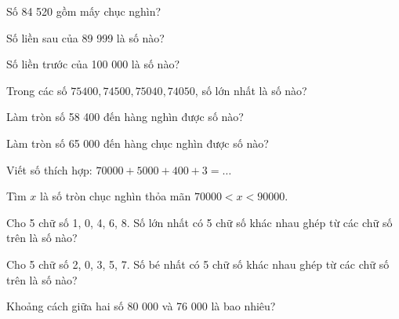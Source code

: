 \begin{ex}
Số 84 520 gồm mấy chục nghìn?
\end{ex}

\begin{ex}
Số liền sau của 89 999 là số nào?
\end{ex}

\begin{ex}
Số liền trước của 100 000 là số nào?
\end{ex}

\begin{ex}
Trong các số $75400, 74500, 75040, 74050$, số lớn nhất là số nào?
\end{ex}

\begin{ex}
Làm tròn số 58 400 đến hàng nghìn được số nào?
\end{ex}

\begin{ex}
Làm tròn số 65 000 đến hàng chục nghìn được số nào?
\end{ex}

\begin{ex}
Viết số thích hợp: $70000 + 5000 + 400 + 3 = \dots$
\end{ex}

\begin{ex}
Tìm $x$ là số tròn chục nghìn thỏa mãn $70000 < x < 90000$.
\end{ex}

\begin{ex}
Cho 5 chữ số 1, 0, 4, 6, 8. Số lớn nhất có 5 chữ số khác nhau ghép từ các chữ số trên là số nào?
\end{ex}

\begin{ex}
Cho 5 chữ số 2, 0, 3, 5, 7. Số bé nhất có 5 chữ số khác nhau ghép từ các chữ số trên là số nào?
\end{ex}

\begin{ex}
Khoảng cách giữa hai số 80 000 và 76 000 là bao nhiêu?
\end{ex}

